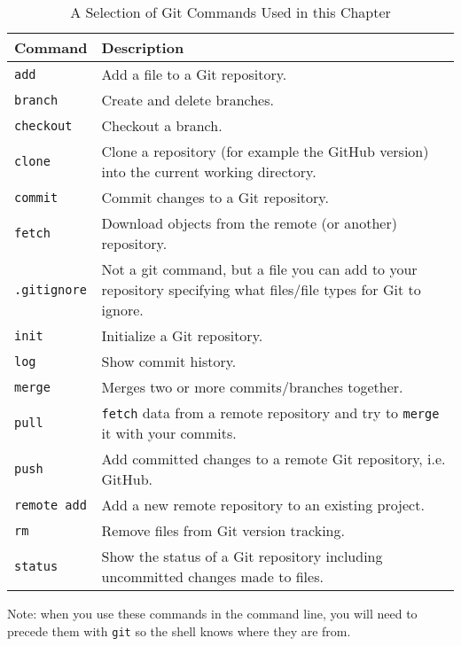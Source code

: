\begin{table}
  \caption{A Selection of Git Commands Used in this Chapter}
  \begin{center}
  \label{GitCommandsTable}
  \begin{tabular}{l p{7cm}}
    \hline  
    Command & Description \\[0.25cm] \hline\hline
    \texttt{add} & Add a file to a Git repository. \\[0.25cm]
    \texttt{branch} & Create and delete branches. \\[0.25cm]
    \texttt{checkout} & Checkout a branch. \\[0.25cm]
    \texttt{clone} & Clone a repository (for example the GitHub version) into the current working directory. \\[0.25cm]
    \texttt{commit} & Commit changes to a Git repository. \\[0.25cm] 
    \texttt{fetch} & Download objects from the remote (or another) repository. \\[0.25cm] 
    \texttt{.gitignore} & Not a git command, but a file you can add to your repository specifying what files/file types for Git to ignore. \\[0.25cm]
    \texttt{init} & Initialize a Git repository. \\[0.25cm]
    \texttt{log} & Show commit history. \\[0.25cm]
    \texttt{merge} & Merges two or more commits/branches together. \\[0.25cm]
    \texttt{pull} & \texttt{fetch} data from a remote repository and try to \texttt{merge} it with your commits. \\[0.25cm]
    \texttt{push} & Add committed changes to a remote Git repository, i.e. GitHub. \\[0.25cm]
    \texttt{remote add} & Add a new remote repository to an existing project. \\[0.25cm]
    \texttt{rm} & Remove files from Git version tracking. \\[0.25cm]
    \texttt{status} & Show the status of a Git repository including uncommitted changes made to files. \\[0.25cm]
    \hline
  \end{tabular}
  \end{center}
  {\scriptsize{Note: when you use these commands in the command line, you will need to precede them with \texttt{git} so the shell knows where they are from.}}
\end{table}

